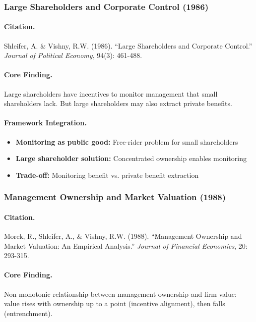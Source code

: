 \subsubsection{Large Shareholders and Corporate Control (1986)}

\paragraph{Citation.}
Shleifer, A. \& Vishny, R.W. (1986).
``Large Shareholders and Corporate Control.''
\emph{Journal of Political Economy}, 94(3): 461-488.

\paragraph{Core Finding.}
Large shareholders have incentives to monitor management that small
shareholders lack. But large shareholders may also extract private benefits.

\paragraph{Framework Integration.}
\begin{itemize}
  \item \textbf{Monitoring as public good:} Free-rider problem for small shareholders
  \item \textbf{Large shareholder solution:} Concentrated ownership enables monitoring
  \item \textbf{Trade-off:} Monitoring benefit vs. private benefit extraction
\end{itemize}

\subsubsection{Management Ownership and Market Valuation (1988)}

\paragraph{Citation.}
Morck, R., Shleifer, A., \& Vishny, R.W. (1988).
``Management Ownership and Market Valuation: An Empirical Analysis.''
\emph{Journal of Financial Economics}, 20: 293-315.

\paragraph{Core Finding.}
Non-monotonic relationship between management ownership and firm value:
value rises with ownership up to a point (incentive alignment), then
falls (entrenchment).

